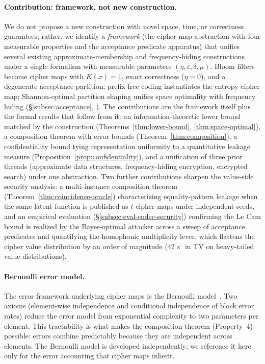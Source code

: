 \documentclass[11pt]{article}
\theoremstyle{definition}
\theoremstyle{plain}
\theoremstyle{remark}
\begin{document}
\paragraph{Contribution: framework, not new construction.}
We do not propose a new construction with novel space, time, or
correctness guarantees; rather, we identify a \emph{framework} (the
cipher map abstraction with four measurable properties and the
acceptance predicate apparatus) that unifies several existing
approximate-membership and frequency-hiding constructions under a
single formalism with measurable parameters $(\eta, \varepsilon, \delta,
\mu)$.  Bloom filters become cipher maps with $K(x) = 1$, exact
correctness ($\eta = 0$), and a degenerate acceptance partition;
prefix-free coding instantiates the entropy cipher map; Shannon-optimal
partition shaping unifies space optimality with frequency hiding
(\S\ref{subsec:acceptance}, ).  The
contributions are the framework itself plus the formal results that
follow from it: an information-theoretic lower bound matched by the
construction (Theorems~\ref{thm:lower-bound}, \ref{thm:space-optimal}),
a composition theorem with error bounds
(Theorem~\ref{thm:composition}), a confidentiality bound tying
representation uniformity to a quantitative leakage measure
(Proposition~\ref{prop:confidentiality}), and a unification of three
prior threads (approximate data structures, frequency-hiding
encryption, encrypted search) under one abstraction.  Two further
contributions sharpen the value-side security analysis: a
multi-instance composition theorem
(Theorem~\ref{thm:coincidence-oracle}) characterizing equality-pattern
leakage when the same latent function is published as $t$ cipher maps
under independent seeds, and an empirical evaluation
(\S\ref{subsec:eval-codec-security}) confirming the Le Cam bound is
realized by the Bayes-optimal attacker across a sweep of acceptance
predicates and quantifying the homophonic multiplicity lever, which
flattens the cipher value distribution by an order of magnitude
($42\times$ in TV on heavy-tailed value distributions).

\paragraph{Bernoulli error model.}
The error framework underlying cipher maps is the Bernoulli
model~\cite{bernoulli2026sets}.  Two axioms (element-wise independence and
conditional independence of block error rates) reduce the error model from
exponential complexity to two parameters per element.  This tractability is
what makes the composition theorem (Property~4) possible: errors combine
predictably because they are independent across elements.  The Bernoulli
model is developed independently; we reference it here only for the error
accounting that cipher maps inherit.
\end{document}
